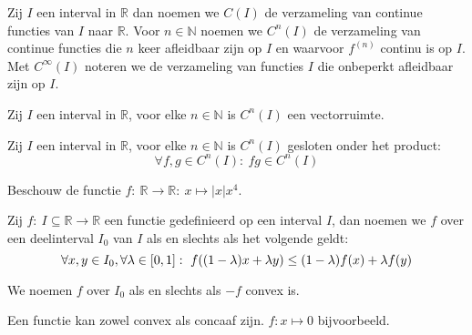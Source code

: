 \documentclass[main.tex]{subfiles}
\begin{document}
\begin{de}
  Zij $I$ een interval in $\mathbb{R}$ dan noemen we $C(I)$ de verzameling van continue functies van $I$ naar $\mathbb{R}$.
  Voor $n\in \mathbb{N}$ noemen we $C^{n}(I)$ de verzameling van continue functies die $n$ keer afleidbaar zijn op $I$ en waarvoor $f^{(n)}$ continu is op $I$.
  Met $C^{\infty}(I)$ noteren we de verzameling van functies $I$ die onbeperkt afleidbaar zijn op $I$.
\end{de}

\begin{st}
  Zij $I$ een interval in $\mathbb{R}$, voor elke $n\in \mathbb{N}$ is $C^{n}(I)$ een vectorruimte.
\end{st}

\begin{st}
  Zij $I$ een interval in $\mathbb{R}$, voor elke $n\in \mathbb{N}$ is $C^{n}(I)$ gesloten onder het product:
  \[ \forall f,g \in C^{n}(I):\ fg \in C^{n}(I) \]
\end{st}


\begin{vb}
  Beschouw de functie $f:\ \mathbb{R} \rightarrow \mathbb{R}:\ x \mapsto |x|x^{4}$.
\end{vb}

\begin{de}
  \label{de:convexe-functie}
  Zij $f:\ I \subseteq \mathbb{R} \rightarrow \mathbb{R}$ een functie gedefinieerd op een interval $I$, dan noemen we $f$  over een deelinterval $I_{0}$ van $I$ als en slechts als het volgende geldt:
  \[ \forall x,y \in I_{0}, \forall \lambda \in \interval{0}{1}:\ f((1-\lambda)x+\lambda y) \le (1-\lambda)f(x) + \lambda f(y)\]
\end{de}
\begin{de}
  We noemen $f$  over $I_{0}$ als en slechts als $-f$ convex is.
\end{de}

\begin{opm}
  Een functie kan zowel convex als concaaf zijn.
  $f: x \mapsto 0$ bijvoorbeeld.
\end{opm}
\end{document}
